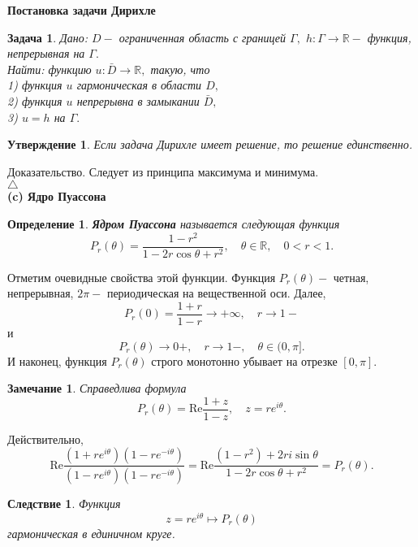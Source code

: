 \documentclass[12pt,a4paper]{article}
\theoremstyle{plain}   \newtheorem{Pro}{Задача}
\newtheorem{Sta}{Утверждение}
\newtheorem{Def}{Определение}
\newtheorem{Rem}{Замечание}
\newtheorem{Cor}{Следствие}
\begin{document}
{\bfseries Постановка задачи Дирихле}
\begin{Pro}
{\Large Дано:}
$ D - $
ограниченная область с границей
$ \Gamma , $
$ h: \Gamma \longrightarrow \mathbb{R} - $
функция, непрерывная на
$ \Gamma . $
\\
{ \Large Найти:}
функцию
$ u:\bar D \longrightarrow \mathbb{R} , $
такую, что
\\
1) функция
$ u $
гармоническая в области
$ D , $
\\
2) функция
$ u $
непрерывна в замыкании
$ \bar D , $
\\
3) $ u=h $ на $ \Gamma . $
\end{Pro}
\begin{Sta}
Если задача Дирихле имеет решение, то решение единственно.
\end{Sta}
{\Large Доказательство.}
Следует из принципа максимума и минимума.
\\
$ \triangle $
\\
{\bfseries (c) Ядро Пуассона}
\begin{Def}
{\bfseries Ядром Пуассона}
называется следующая функция
$$
  P_r (\theta )=
  \frac{1-r^2}{1-2r\cos \theta +r^2},
  \quad \theta \in \mathbb{R},
  \quad 0<r<1.
$$
\end{Def}
Отметим очевидные свойства этой функции.
Функция
$ P_r (\theta ) - $
четная, непрерывная,
$ 2\pi-$
периодическая на вещественной оси.
Далее,
$$
  P_r (0)=\frac{1+r}{1-r} \rightarrow +\infty ,
  \quad r \rightarrow 1-
$$
и
$$
  P_r (\theta ) \rightarrow 0+ ,
  \quad r \rightarrow 1-  , \quad
  \theta \in (0, \pi ] .
$$
И наконец, функция
$ P_r (\theta ) $
строго монотонно убывает на отрезке
$ [0,\pi ]. $
\begin{Rem}
Справедлива формула
$$
  P_r (\theta )= \mathrm{Re}\frac{1+z}{1-z} ,
  \quad z=re^{i\theta}.
$$
\end{Rem}
Действительно,
$$
 \mathrm{Re} \frac{(1+re^{i\theta})(1-re^{-i\theta})}
 {(1-re^{i\theta})(1-re^{-i\theta})}=
 \mathrm{Re}\frac{(1-r^2)+2ri \sin \theta}
 {1-2r \cos \theta +r^2}=P_r (\theta ).
$$
\begin{Cor}
Функция
$$
  z=re^{i\theta} \mapsto P_r (\theta )
$$
гармоническая в единичном круге.
\end{Cor}
\end{document}
